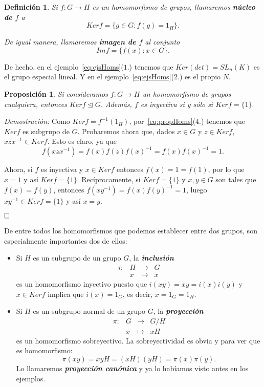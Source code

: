 \documentclass[12pt]{article}
\newtheorem{proposition}[theorem]{Proposición}
\newtheorem{definition}[theorem]{Definición}
\begin{document}
\begin{definition}Si $f \colon G \longrightarrow H$ es un homomorfismo de grupos, llamaremos \textbf{núcleo de $f$} a $$Ker f= \lbrace g \in G: f(g) = 1_H \rbrace.$$

De igual manera, llamaremos \textbf{imagen de $f$} al conjunto $$Im f = \lbrace f(x) : x \in G\rbrace.$$
\end{definition}

De hecho, en el ejemplo~\ref{eq:ejsHoms}($1.$) tenemos que $Ker(det) = SL_n(K)$ es el grupo especial lineal. Y en el ejemplo~\ref{eq:ejsHoms}($2.$) es el propio $N$.

\begin{proposition}Si consideramos $f \colon G \longrightarrow H$ un homomorfismo de grupos cualquiera, entonces $Ker f \unlhd G$. Además, $f$ es inyectiva si y sólo si $Ker f= \lbrace 1 \rbrace.$
\end{proposition}
\emph{Demostración: }Como $Ker f=f^{-1} (1_H)$, por~\ref{eq:propHoms}($4.$) tenemos que $Ker f$ es subgrupo de $G$. Probaremos ahora que, dados $x \in G$ y $z \in Ker f$, $xzx^{-1} \in Ker f$. Esto es claro, ya que $$f(xzx^{-1})=f(x)f(z)f(x)^{-1} = f(x)f(x)^{-1} = 1.$$

Ahora, si $f$ es inyectiva y $x \in Ker f$ entonces $f(x) = 1 = f(1)$, por lo que $x = 1$ y así $Ker f = \lbrace 1 \rbrace$. Recíprocamente, si $Ker f = \lbrace 1 \rbrace$ y $x,y \in G$ son tales que $f(x) = f(y)$, entonces $f(xy^{-1}) = f(x)f(y)^{-1} = 1$, luego $xy^{-1} \in Ker f = \lbrace 1 \rbrace$ y así $x=y$.

$\hfill \square$

De entre todos los homomorfismos que podemos establecer entre dos grupos, son especialmente importantes dos de ellos: 

\begin{itemize}
\item Si $H$ es un subgrupo de un grupo $G$, la \textbf{\textit{inclusión}} $$\begin{array}{rccl}
i \colon &H & \longrightarrow & G\\
&x & \longmapsto &x
\end{array}
$$ es un homomorfismo inyectivo puesto que $i(xy) = xy = i(x)i(y)$ y $x \in Ker f$ implica que $i(x) = 1_{G}$, es decir, $x = 1_{G} = 1_{H}$.
\item Si $H$ es un subgrupo normal de un grupo $G$, la \textbf{\textit{proyección}} $$\begin{array}{rccl}
\pi \colon &G & \longrightarrow & G/H\\
&x & \longmapsto &xH
\end{array}
$$ es un homomorfismo sobreyectivo. La sobreyectividad es obvia y para ver que es homomorfismo: $$\pi (xy) = xyH = (xH)(yH) = \pi (x) \pi (y).$$ Lo llamaremos \textbf{\textit{proyección canónica}} y ya lo habíamos visto antes en los ejemplos.
\end{itemize}
\end{document}
